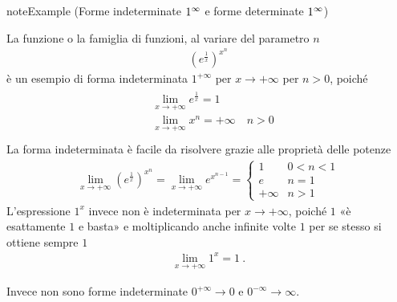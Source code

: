 \documentclass[letterpaper,10pt,italian]{jupyterBook}
\begin{document}
\begin{sphinxadmonition}{note}{Example  (Forme indeterminate \protect\(1^{\infty}\protect\) e forme determinate \protect\(1^{\infty}\protect\))}



\sphinxAtStartPar
La funzione \sphinxhyphen{} o la famiglia di funzioni, al variare del parametro \(n\) \sphinxhyphen{}
\begin{equation*}
\begin{split}\left( e^{\frac{1}{x}} \right)^{x^n}\end{split}
\end{equation*}
\sphinxAtStartPar
è un esempio di forma indeterminata \(1^{+\infty}\) per \(x \rightarrow +\infty\) per \(n>0\), poiché
\begin{equation*}
\begin{split}\begin{aligned}
  & \lim_{x \rightarrow +\infty} e^{\frac{1}{x}} = 1 \\
  & \lim_{x \rightarrow +\infty} x^n = +\infty \quad n > 0 \\
\end{aligned}\end{split}
\end{equation*}
\sphinxAtStartPar
La forma indeterminata è facile da risolvere grazie alle proprietà delle potenze
\begin{equation*}
\begin{split}\lim_{x \rightarrow +\infty} \left( e^{\frac{1}{x}} \right)^{x^n} = \lim_{x \rightarrow +\infty} e^{x^{n-1}} = \begin{cases} 1 & 0 < n < 1 \\ e & n = 1 \\ +\infty & n > 1 \end{cases}\end{split}
\end{equation*}
\sphinxAtStartPar
L’espressione \(1^{x}\) invece non è indeterminata per \(x \rightarrow +\infty\), poiché \(1\) «è esattamente \(1\) e basta» e moltiplicando anche infinite volte \(1\) per se stesso si ottiene sempre \(1\)
\begin{equation*}
\begin{split}\lim_{x \rightarrow +\infty} 1^{x} = 1 \ .\end{split}
\end{equation*}\end{sphinxadmonition}

\sphinxAtStartPar
{} Invece non sono forme indeterminate \(0^{+\infty} \rightarrow 0\) e \(0^{-\infty} \rightarrow \infty\).
\end{document}
